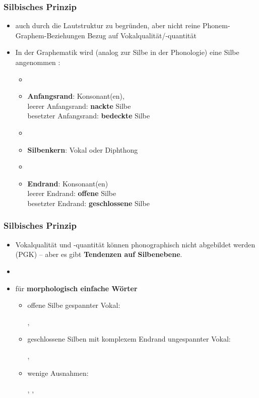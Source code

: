 \begin{frame}
\frametitle{Silbisches Prinzip}

\begin{itemize}
	\item auch durch die Lautstruktur zu begründen, aber nicht reine Phonem-Graphem-Beziehungen \ras Bezug auf Vokalqualität/-quantität
	
	\item In der Graphematik wird (analog zur Silbe in der Phonologie) eine Silbe angenommen \citep[vgl.][]{Fuhrhop08a}:
	
	\begin{itemize}
		\item[]
		\item \textbf{Anfangsrand}: Konsonant(en),\\
		leerer Anfangsrand: \textbf{nackte} Silbe\\
		besetzter Anfangsrand: \textbf{bedeckte} Silbe
		\item[]
		\item \textbf{Silbenkern}: Vokal oder Diphthong
		\item[]
		\item \textbf{Endrand}: Konsonant(en)\\
		leerer Endrand: \textbf{offene} Silbe\\
		besetzter Endrand: \textbf{geschlossene} Silbe
	\end{itemize}
\end{itemize}

\end{frame}


\begin{frame}
\frametitle{Silbisches Prinzip}

\begin{itemize}
	\item Vokalqualität und -quantität können phonographisch nicht abgebildet werden (PGK) -- aber es gibt \textbf{Tendenzen auf Silbenebene}.
	\item[]
	\item für \textbf{morphologisch einfache Wörter} 
	
	\begin{itemize}
		\item offene Silbe \ras gespannter Vokal: 
		
		\ea {}, 
		\z
		
		\item geschlossene Silben mit komplexem Endrand \ras ungespannter Vokal: 
		
		\ea
		, 
		\z
		
		\item wenige Ausnahmen: 
		
		\ea
		, , 
		\z
		
	\end{itemize}
	
\end{itemize}


\end{frame}




